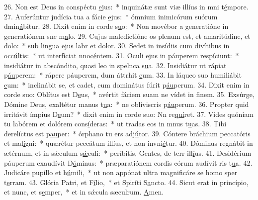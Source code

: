 26. Non est Deus in conspéctu \uline{e}jus:~* inquinátæ sunt viæ illíus in mni t\uline{é}mpore.
27. Auferúntur judícia tua a fácie \uline{e}jus:~* ómnium inimicórum suórum dmin\uline{á}bitur.
28. Dixit enim in corde s\uline{u}o:~* Non movébor a generatióne in generatiónem sne m\uline{a}lo.
29. Cujus maledictióne os plenum est, et amaritúdine, et d\uline{o}lo:~* sub lingua ejus labr et d\uline{o}lor.
30. Sedet in insídiis cum divítibus in occ\uline{ú}ltis:~* ut interfíciat nnoc\uline{é}ntem.
31. Oculi ejus in páuperem resp\uline{í}ciunt:~* insidiátur in abscóndito, quasi leo in spelnca s\uline{u}a.
32. Insidiátur ut rápiat p\uline{áu}perem:~* rápere páuperem, dum áttrhit \uline{e}um.
33. In láqueo suo humiliábit \uline{e}um:~* inclinábit se, et cadet, cum dominátus fúrit p\uline{áu}perum.
34. Dixit enim in corde suo: Oblítus est D\uline{e}us,~* avértit fáciem suam ne vídet in f\uline{i}nem.
35. Exsúrge, Dómine Deus, exaltétur manus t\uline{u}a:~* ne obliviscris p\uline{áu}perum.
36. Propter quid irritávit ímpius D\uline{e}um?~* dixit enim in corde suo: Nn re\uline{quí}ret.
37. Vides quóniam tu labórem et dolórem cons\uline{í}deras:~* ut tradas eos in mnus t\uline{u}as.
38. Tibi derelíctus est p\uline{au}per:~* órphano tu ers adj\uline{ú}tor.
39. Cóntere bráchium peccatóris et mal\uline{í}gni:~* quærétur peccátum illíus, et non invni\uline{é}tur.
40. Dóminus regnábit in ætérnum, et in sǽculum s\uline{ǽ}culi:~* períbitis, Gentes, de terr ill\uline{í}us.
41. Desidérium páuperum exaudívit D\uline{ó}minus:~* præparatiónem cordis eórum audívit ris t\uline{u}a.
42. Judicáre pupíllo et h\uline{ú}mili,~* ut non appónat ultra magnificáre se homo sper t\uline{e}rram.
43. Glória Patri, et F\uline{í}lio,~* et Spiríti S\uline{a}ncto.
44. Sicut erat in princípio, et nunc, et s\uline{e}mper,~* et in sǽcula sæculrum. \uline{A}men.
